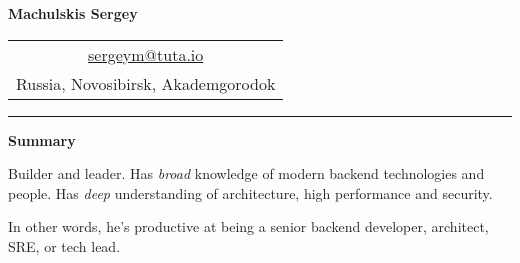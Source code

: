 \documentclass[final]{letter}
\begin{document}
\begin{center}

{\fontsize{25}{40}\selectfont\bf{Machulskis Sergey}}
  {\hfill
    \begin{tabular}{c}
        \href{mailto:sergeym@tuta.io}{sergeym@tuta.io}\\
        Russia, Novosibirsk, Akademgorodok
     \end{tabular}
  }
\rule{.98\textwidth}{1pt}

\addvspace{.1cm}

\end{center}
{\bf Summary}

Builder and leader. Has \textit{broad} knowledge of modern backend technologies and people. Has \textit{deep} understanding of architecture, high performance and security.

In other words, he's productive at being a senior backend developer, architect, SRE, or tech lead.
\end{document}
